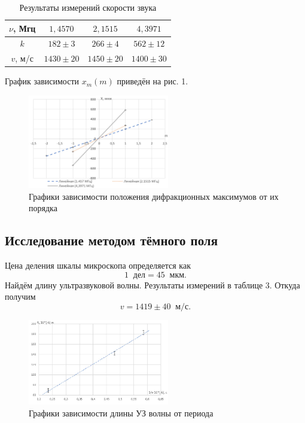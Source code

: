 \documentclass[a4paper]{article}
\begin{document}
\begin{table}[!ht]
    \centering
    \caption{Результаты измерений скорости звука}
    \begin{tabular}{|c|c|c|c|}
    \hline
    $\nu$, Мгц & $1,4570$      & $2,1515$      & $4,3971$      \\ \hline
    $k$        & $182 \pm 3$   & $266 \pm 4$   & $562 \pm 12$  \\ \hline
    $v$, м/с   & $1430 \pm 20$ & $1450 \pm 20$ & $1400 \pm 30$ \\ \hline
    \end{tabular}
    \end{table}


\noindent График зависимости $x_m(m)$ приведён на рис. 1.
\begin{figure}[!ht]
			\begin{center}
				\includegraphics[width = 0.55\textwidth]{images/Im1.jpg}
		        \caption{Графики зависимости положения дифракционных максимумов от их порядка}
			\end{center}
\end{figure}

\subsection{Исследование методом тёмного поля}


Цена деления шкалы микроскопа определяется как $$1 \;\;\text{дел} = 45 \;\;\text{мкм}.$$ Найдём длину ультразвуковой волны. Результаты измерений в таблице 3. Откуда получим $$v = 1419 \pm 40 \;\; \text{м/с}.$$

\begin{figure}[!ht]
			\begin{center}
				\includegraphics[width = 0.55\textwidth]{images/Im2.jpg}
		        \caption{Графики зависимости длины УЗ волны от периода}
			\end{center}
\end{figure}
\end{document}
